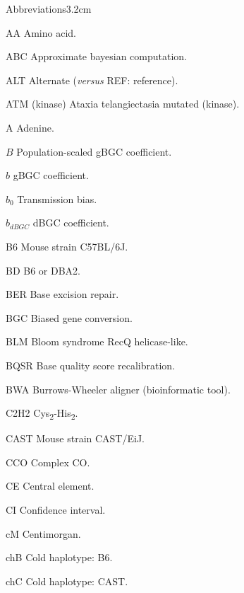 


\begin{mclistof}{Abbreviations}{3.2cm}

\item[AA] Amino acid.
\item[ABC] Approximate bayesian computation.
\item[ALT] Alternate (\textit{versus} REF\@: reference).
\item[ATM (kinase)] Ataxia telangiectasia mutated (kinase).
\item[A] Adenine.
\item[$B$] Population-scaled gBGC coefficient.
\item[$b$] gBGC coefficient.
\item[$b_0$] Transmission bias.
\item[$b_{dBGC}$] dBGC coefficient.
\item[B6] Mouse strain C57BL/6J\@.
\item[BD] B6 or DBA2.
\item[BER] Base excision repair.
\item[BGC] Biased gene conversion.
\item[BLM] Bloom syndrome RecQ helicase-like.
\item[BQSR] Base quality score recalibration.
\item[BWA] Burrows-Wheeler aligner (bioinformatic tool).
\item[C2H2] Cys\textsubscript{2}-His\textsubscript{2}.
\item[CAST] Mouse strain CAST/EiJ\@.
\item[CCO] Complex CO\@.
\item[CE] Central element.
\item[CI] Confidence interval.
\item[cM] Centimorgan.
\item[chB] Cold haplotype: B6.
\item[chC] Cold haplotype: CAST\@.

\end{mclistof}
